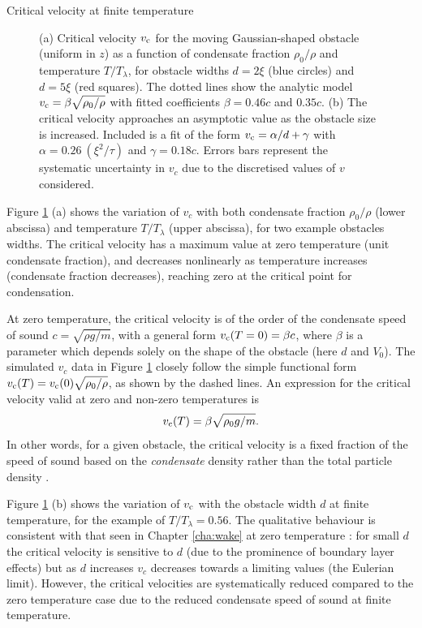 \begin{chapter}{\label{cha:nonequib}Critical velocity at finite temperature}
\begin{figure}
\begin{center}
\end{center}
  \caption{\label{fig:vc-n0}(a) Critical velocity $v_{\rm c}$ for the moving Gaussian-shaped obstacle (uniform in $z$) as a function of condensate fraction $\rho_0/\rho$ and temperature $T/T_\lambda$, for obstacle widths $d=2\xi$ (blue circles) and $d=5\xi$ (red squares). The dotted lines show the analytic model $v_{\rm c}=\beta \sqrt{\rho_0/\rho}$ with fitted coefficients $\beta=0.46c$ and $0.35c$. (b) The critical velocity approaches an asymptotic value as the obstacle size is increased. Included is a fit of the form $v_{\rm c}=\alpha/d+\gamma$ with $\alpha=0.26~(\xi^2/\tau)$ and $\gamma=0.18 c$.  Errors bars represent the systematic uncertainty in $v_c$ due to the discretised values of $v$ considered.}
\end{figure}

Figure \ref{fig:vc-n0} (a) shows the variation of $v_c$ with both condensate fraction $\rho_0/\rho$ (lower abscissa) and temperature $T/T_\lambda$ (upper abscissa), for two example obstacles widths.  The critical velocity has a maximum value at zero temperature (unit condensate fraction), and decreases nonlinearly as temperature increases (condensate fraction decreases), reaching zero at the critical point for condensation.

At zero temperature, the critical velocity is of the order of the condensate speed of sound $c=\sqrt{\rho g/m}$, with a general form $v_{\rm c}(T=0)=\beta c$,
where $\beta$ is a parameter which depends solely on the shape of the
obstacle (here $d$ and $V_0$).  The simulated $v_c$ data in
Figure \ref{fig:vc-n0} closely follow the simple functional form
$v_{\rm c}(T) = v_{\rm c}(0) \sqrt{\rho_0/\rho}$, as shown by the dashed lines.
An expression for the critical velocity valid at zero and non-zero
temperatures is
\begin{equation}
v_{\rm c}(T)=\beta \sqrt{\rho_0 g/m}.
\label{eqn:finite_vc}
\end{equation}
In other words, for a given obstacle, the critical velocity is a fixed
fraction of the speed of sound based on the {\it condensate} density
rather than the total particle density \cite{leadbeater_2003}.

Figure \ref{fig:vc-n0} (b) shows the variation of $v_{\rm c}$ with the obstacle width $d$ at finite temperature, for the example of $T/T_\lambda =0.56$.   The qualitative behaviour is consistent with that seen in Chapter \ref{cha:wake} at zero temperature \cite{huepe00,rica2001,stagg_parker_14}: for small $d$ the critical velocity is sensitive to $d$ (due to the prominence of boundary layer effects) but as $d$ increases $v_c$ decreases towards a limiting values (the Eulerian limit).  However, the critical velocities are systematically reduced compared to the zero temperature case due to the reduced condensate speed of sound at finite temperature.



\end{chapter}
